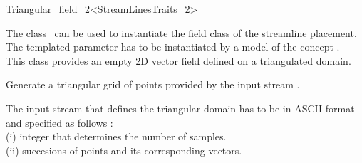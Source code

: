 

\begin{ccRefClass}{Triangular_field_2<StreamLinesTraits_2>}  %

\ccDefinition
  
The class \ccRefName\ can be used to instantiate the field class of
the streamline placement.  The templated parameter  has to be
instantiated by a model of the concept .\\
This class provides an empty 2D vector field defined on a triangulated domain.

\ccCreation
{}  %


\ccThreeToTwo
{}
{Generate a triangular grid \ccVar of points provided by the input stream .}

The input stream that defines the triangular domain has to be in ASCII format and specified as follows :\\
(i) integer that determines the number of samples.\\
(ii) succesions of points and its corresponding vectors.\\

\ccIsModel 

 \\


\ccSeeAlso
{} \\
\end{ccRefClass}


